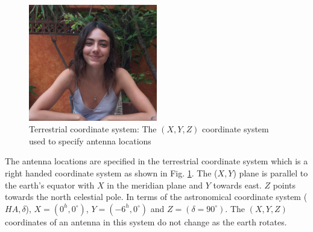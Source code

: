 \begin{figure}[!htb]
	\centering \vspace{-0.1in}
	\includegraphics[width=0.5\textwidth]{images/terrestrial.png}	
	\caption[Terrestrial coordinate system]{\small Terrestrial coordinate system: The $(X,Y,Z)$ coordinate system used to specify antenna locations  \footnotemark}
	\label{fig:terr}
\end{figure}

The antenna locations are specified in the terrestrial coordinate system which is a right handed coordinate system as shown in Fig. \ref{fig:terr}.
The ($X,Y$) plane is parallel to the earth's equator with $X$ in the meridian plane and $Y$ towards east.  $Z$ points towards the north celestial pole. In terms of the astronomical coordinate system ($HA,\delta$), $X=(0^h,0^\circ)$, $Y=(-6^h,0^\circ)$ and  $Z=(\delta=90^\circ)$. The $(X,Y,Z)$ coordinates of an antenna in this system do not change as the earth rotates. 

